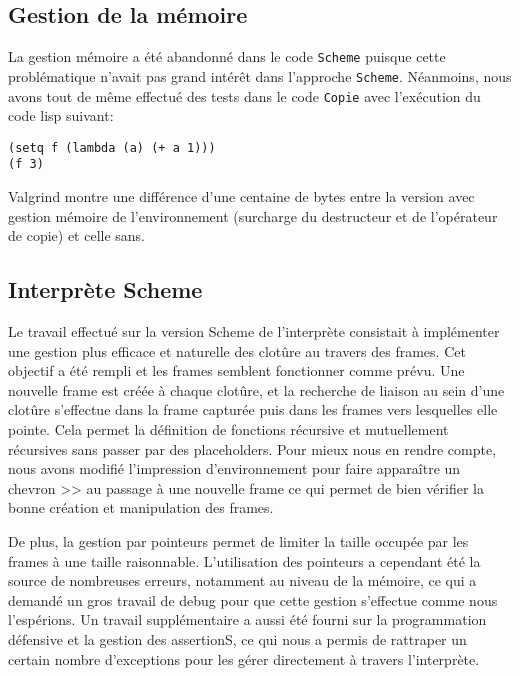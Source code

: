 \documentclass[a4paper,11pt]{article}
\begin{document}
\subsection{Gestion de la mémoire}

La gestion mémoire a été abandonné dans le code \texttt{Scheme} puisque cette 
problématique n'avait pas grand intérêt dans l'approche \texttt{Scheme}. Néanmoins,
nous avons tout de même effectué des tests dans le code \texttt{Copie} avec
l'exécution du
code lisp suivant:

\begin{lstlisting}
(setq f (lambda (a) (+ a 1)))
(f 3)
\end{lstlisting}

Valgrind montre une différence d'une centaine de bytes entre la version avec
gestion mémoire de l'environnement (surcharge du destructeur et de l'opérateur
de copie) et celle sans.

 \subsection{Interprète Scheme}

 Le travail effectué sur la version Scheme de l'interprète consistait à implémenter 
 une gestion plus efficace et naturelle des clotûre au travers des frames. Cet 
 objectif a été rempli et les frames semblent fonctionner comme prévu. Une nouvelle
 frame est créée à chaque clotûre, et la recherche de liaison au sein d'une clotûre 
 s'effectue dans la frame capturée puis dans les frames vers lesquelles elle pointe. 
 Cela permet la définition de fonctions récursive et mutuellement récursives sans 
 passer par des placeholders. Pour mieux nous en rendre compte, nous avons
 modifié l'impression d'environnement pour faire apparaître un chevron >> au
 passage à une nouvelle frame ce qui permet de bien vérifier la bonne création
 et manipulation des frames.
 
 De plus, la gestion par pointeurs permet de limiter la taille occupée par les frames 
 à une taille raisonnable. L'utilisation des pointeurs a cependant été la source de 
 nombreuses erreurs, notamment au niveau de la mémoire, ce qui a demandé un gros 
 travail de debug pour que cette gestion s'effectue comme nous l'espérions. Un travail 
 supplémentaire a aussi été fourni sur la programmation défensive et la gestion des
 assertionS, ce qui nous a permis de rattraper un certain nombre d'exceptions pour les 
 gérer directement à travers l'interprète.
\end{document}
